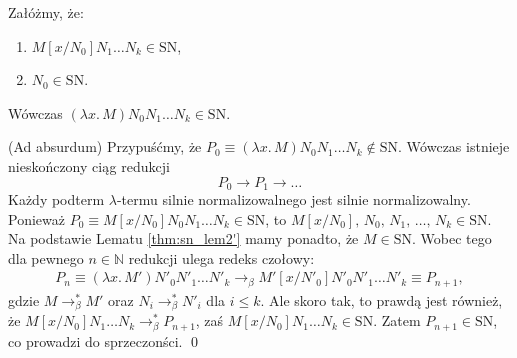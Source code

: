 \begin{lemat}\label{thm:sn_lemat2}
  Załóżmy, że:
  \begin{enumerate}[label=(\alph*)]
    \setlength\itemsep{0em}
    \item  \(M[x/N_0]N_1\dots N_k\in\mathrm{SN}\),\label{def:l2_a}
    \item  \(N_0\in \mathrm{SN}\).\label{def:l2_b}
  \end{enumerate}
  Wówczas \((\lambda x.\,M)N_0 N_1 \dots N_k \in \mathrm{SN}\).
\end{lemat}
\begin{dowod}
  (Ad  absurdum) Przypuśćmy,  że  \(P_0\equiv(\lambda  x.\, M)N_0  N_1
  \dots N_k \not\in\mathrm{SN}\). Wówczas istnieje nieskończony ciąg redukcji
  \[
    P_0\to P_1 \to \dots
  \]
  Każdy podterm \(\lambda\)-termu silnie normalizowalnego jest silnie
  normalizowalny. Ponieważ \(P_0\equiv M[x/N_0]N_0  N_1 \dots N_k
  \in\mathrm{SN}\), to \(M[x/N_0],\,N_0,\,  N_1,\, \dots,\, N_k
  \in\mathrm{SN}\). Na podstawie Lematu \ref{thm:sn_lem2'} mamy ponadto, że \(M\in\mathrm{SN}\). Wobec tego dla pewnego \(n\in\mathbb{N}\) redukcji ulega redeks czołowy:
  \begin{align*}
    P_n\equiv (\lambda x.\,M')N'_0 N'_1 \dots N'_k\to_\beta M'[x/N'_0]N'_0 N'_1\dots N'_k\equiv P_{n+1},
  \end{align*}
    gdzie \(M\to^{*}_\beta M'\) oraz \(N_i \to^{*}_\beta N'_i\) dla \(i\leq k\). Ale skoro tak, to prawdą jest również, że \(M[x/N_0]N_1\dots N_k \to^{*}_\beta P_{n+1}\), zaś \(M[x/N_0]N_1\dots N_k \in \mathrm{SN}\). Zatem \(P_{n+1}\in\mathrm{SN}\), co prowadzi do sprzeczonści.
  \qed
\end{dowod}

